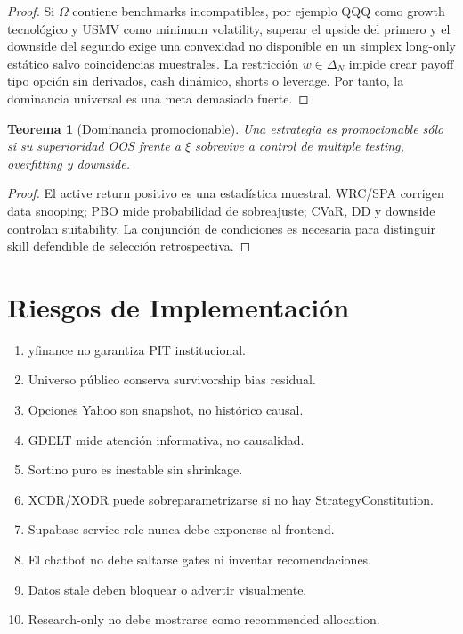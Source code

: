 \documentclass[11pt,letterpaper]{article}
\newtheorem{theorem}{Teorema}
\newcommand{\1}{\mathbbm{1}}
\begin{document}
\begin{proof}
Si \(\Omega\) contiene benchmarks incompatibles, por ejemplo QQQ como growth tecnológico y USMV como minimum volatility, superar el upside del primero y el downside del segundo exige una convexidad no disponible en un simplex long-only estático salvo coincidencias muestrales. La restricción \(w\in\Delta_N\) impide crear payoff tipo opción sin derivados, cash dinámico, shorts o leverage. Por tanto, la dominancia universal es una meta demasiado fuerte.
\end{proof}

\begin{theorem}[Dominancia promocionable]
Una estrategia es promocionable sólo si su superioridad OOS frente a \(\xi\) sobrevive a control de multiple testing, overfitting y downside.
\end{theorem}

\begin{proof}
El active return positivo es una estadística muestral. WRC/SPA corrigen data snooping; PBO mide probabilidad de sobreajuste; CVaR, DD y downside controlan suitability. La conjunción de condiciones es necesaria para distinguir skill defendible de selección retrospectiva.
\end{proof}

\section{Riesgos de Implementación}

\begin{enumerate}
  \item yfinance no garantiza PIT institucional.
  \item Universo público conserva survivorship bias residual.
  \item Opciones Yahoo son snapshot, no histórico causal.
  \item GDELT mide atención informativa, no causalidad.
  \item Sortino puro es inestable sin shrinkage.
  \item XCDR/XODR puede sobreparametrizarse si no hay StrategyConstitution.
  \item Supabase service role nunca debe exponerse al frontend.
  \item El chatbot no debe saltarse gates ni inventar recomendaciones.
  \item Datos stale deben bloquear o advertir visualmente.
  \item Research-only no debe mostrarse como recommended allocation.
\end{enumerate}
\end{document}
